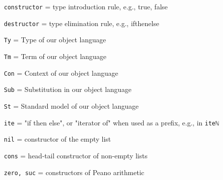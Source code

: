 \verb$constructor$ = type introduction rule, e.g., true, false

\verb$destructor$ = type elimination rule, e.g., if\textunderscore then\textunderscore else\textunderscore

\verb$Ty$ = Type of our object language

\verb$Tm$ = Term of our object language

\verb$Con$ = Context of our object language

\verb$Sub$ = Substitution in our object language

\verb$St$ = Standard model of our object language

\verb$ite$ = "if then else", or "iterator of" when used as a prefix, e.g., in \verb$iteℕ$

\verb$nil$ = constructor of the empty list

\verb$cons$ = head-tail constructor of non-empty lists

\verb$zero, suc$ = constructors of Peano arithmetic

